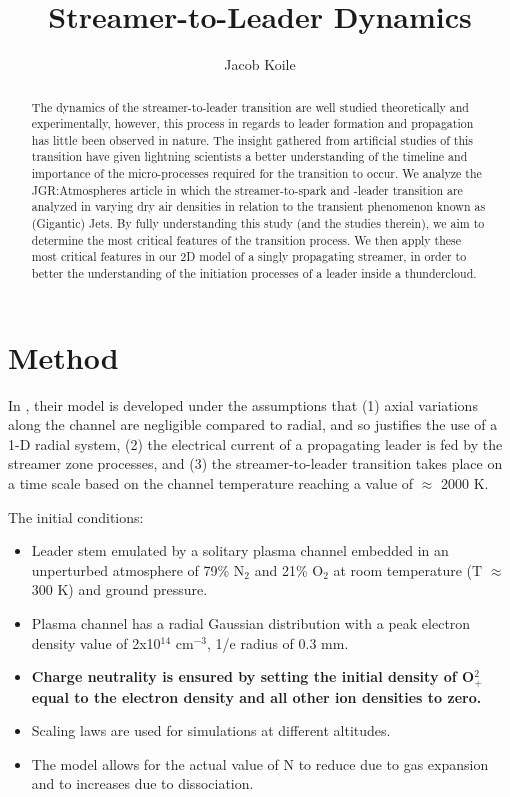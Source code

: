 \documentclass[]{article}
\title{Streamer-to-Leader Dynamics}
\author{Jacob Koile}
\begin{document}
\maketitle

\begin{abstract}
	The dynamics of the streamer-to-leader transition are well studied theoretically and experimentally, however, this process in regards to leader formation and propagation has little been observed in nature. The insight gathered from artificial studies of this transition have given lightning scientists a better understanding of the timeline and importance of the micro-processes required for the transition to occur. We analyze the JGR:Atmospheres article \citet{daSilva:2013a} in which the streamer-to-spark and -leader transition are analyzed in varying dry air densities in relation to the transient phenomenon known as (Gigantic) Jets. By fully understanding this study (and the studies therein), we aim to determine the most critical features of the transition process. We then apply these most critical features in our 2D model of a singly propagating streamer, in order to better the understanding of the initiation processes of a leader inside a thundercloud.
	
\end{abstract}

\section{Method}
	In \citet{daSilva:2013a}, their model is developed under the assumptions that (1) axial variations along the channel are negligible compared to radial, and so justifies the use of a 1-D radial system, (2) the electrical current of a propagating leader is fed by the streamer zone processes, and (3) the streamer-to-leader transition takes place on a time scale based on the channel temperature reaching a value of $\approx$ 2000 K. 
	
	The initial conditions:
	\begin{itemize}
		\item Leader stem emulated by a solitary plasma channel embedded in an unperturbed atmosphere of 79\% N$_2$ and 21\% O$_2$ at room temperature (T $\approx$ 300 K) and ground pressure.
		\item Plasma channel has a radial Gaussian distribution with a peak electron density value of 2x10$^{14}$ cm$^{-3}$, 1/e radius of 0.3 mm.
		\item \textbf{Charge neutrality is ensured by setting the initial density of O$^2_+$ equal to the electron density and all other ion densities to zero.}
		\item Scaling laws are used for simulations at different altitudes.
		\item The model allows for the actual value of N to reduce due to gas expansion and to increases due to dissociation.
	\end{itemize}
\end{document}
